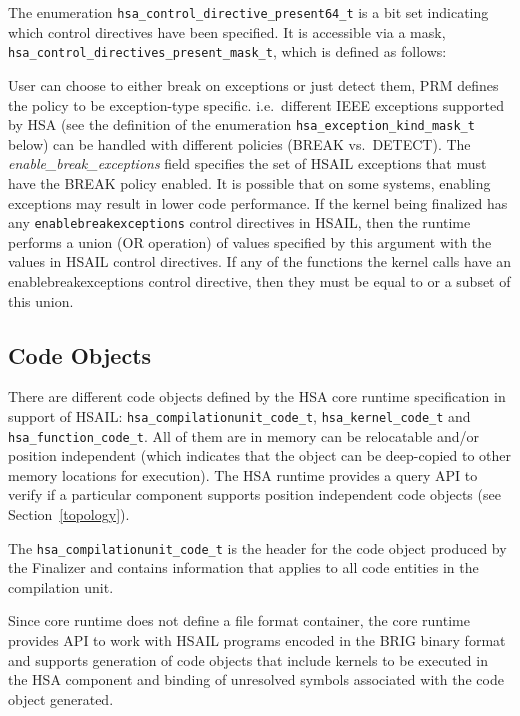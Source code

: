 The enumeration \texttt{hsa\_control\_directive\_present64\_t} is a
bit set indicating which control directives have been specified. It
is accessible via a mask, 
\texttt{hsa\_control\_directives\_present\_mask\_t}, which
is defined as follows:



User can choose to either break on exceptions or just detect them,
PRM defines the policy to be exception-type specific. i.e.\ different
IEEE exceptions supported by HSA (see the definition of the
enumeration \texttt{hsa\_exception\_kind\_mask\_t} below)  can be
handled with different policies (BREAK vs.\ DETECT). 
The {\itshape enable\_break\_exceptions} field specifies the set of
HSAIL exceptions that must have the BREAK policy enabled. It is
possible that on some systems, enabling exceptions may result in
lower code performance.
If the kernel being finalized has any \texttt{enablebreakexceptions}
control directives in HSAIL, then the runtime performs a union (OR
operation) of values specified by this argument with the values in
HSAIL control directives. If any of the functions the kernel calls
have an enablebreakexceptions control directive, then they must be
equal to or a subset of this union.



\subsection{Code Objects}\label{finalize:codeobject}

There are different code objects defined by the HSA core runtime
specification in support of HSAIL: 
\texttt{hsa\_compilationunit\_code\_t},
\texttt{hsa\_kernel\_code\_t} and \texttt{hsa\_function\_code\_t}.
All of them are in memory can be relocatable and/or position
independent (which indicates that the object can be deep-copied to
other memory locations for execution). The HSA runtime provides a
query API to verify if a particular component supports position
independent code objects (see Section~\ref{topology}). 

The \texttt{hsa\_compilationunit\_code\_t} is the header for the
code object produced by the Finalizer and contains information that
applies to all code entities in the compilation unit.

Since core runtime does not define a file format container, the core
runtime provides API to work with HSAIL programs encoded in the BRIG
binary format and supports generation of code objects that
include kernels to be executed in the HSA component and binding
of unresolved symbols associated with the code object
generated.  

